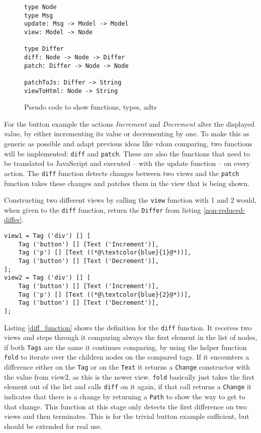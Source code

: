 \begin{figure}
    \centering
\begin{verbatim}
type Node
type Msg
update: Msg -> Model -> Model
view: Model -> Node 

type Differ
diff: Node -> Node -> Differ
patch: Differ -> Node -> Node

patchToJs: Differ -> String
viewToHtml: Node -> String
\end{verbatim}
    \caption{Pseudo code to show functions, types, \glspl{adt}}
    \label{fig:mvu_types}
\end{figure}

For the button example the actions \textit{Increment} and \textit{Decrement} alter the displayed value, by either incrementing its value or decrementing by one.
To make this as generic as possible and adapt previous ideas like \gls{vdom} comparing, two functions will be implemented: \texttt{diff} and \texttt{patch}. These are also the functions that need to be translated to JavaScript and executed -- with the update function -- on every action.
The \texttt{diff} function detects changes between two views and the \texttt{patch} function takes these changes and patches them in the view that is being shown.

Constructing two different views by calling the \texttt{view} function with 1 and 2 would, when given to the \texttt{diff} function, return the \texttt{Differ} from listing \ref{non-reduced-differ}.

\begin{lstlisting}[columns=fullflexible, label={two_views}, language=JaLi, caption=Two views to compare]
view1 = Tag ('div') [] [
    Tag ('button') [] [Text ('Increment')],
    Tag ('p') [] [Text ((*@\textcolor{blue}{1}@*))],
    Tag ('button') [] [Text ('Decrement')],
];
view2 = Tag ('div') [] [
    Tag ('button') [] [Text ('Increment')],
    Tag ('p') [] [Text ((*@\textcolor{blue}{2}@*))],
    Tag ('button') [] [Text ('Decrement')],
];
\end{lstlisting}

Listing \ref{diff_function} shows the definition for the \texttt{diff} function. It receives two views and steps through it comparing always the first element in the list of nodes, if both \texttt{Tags} are the same it continues comparing, by using the helper function \texttt{fold} to iterate over the children nodes on the compared tags.
If it encounters a difference either on the \texttt{Tag} or on the \texttt{Text} it returns a \texttt{Change} constructor with the value from view2, as this is the newer view.
\texttt{fold} basically just takes the first element out of the list and calls \texttt{diff} on it again, if that call returns a \texttt{Change} it indicates that there is a change by returning a \texttt{Path} to show the way to get to that change.
This function at this stage only detects the first difference on two views and then terminates. This is for the trivial button example sufficient, but should be extended for real use.

